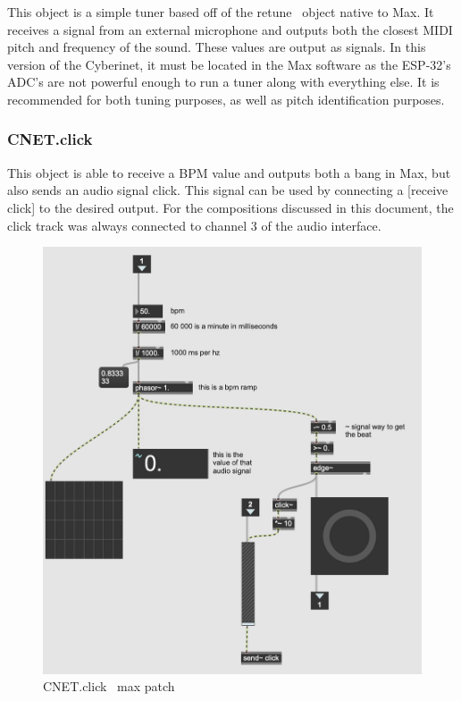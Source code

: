 This object is a simple tuner based off of the retune~ object native to Max. It receives a signal from an external microphone and outputs both the closest MIDI pitch and frequency of the sound. These values are output as signals. In this version of the Cyberinet, it must be located in the Max software as the ESP-32's ADC's are not powerful enough to run a tuner along with everything else. It is recommended for both tuning purposes, as well as pitch identification purposes. 
 

\subsubsection{CNET.click~}
This object is able to receive a BPM value and outputs both a bang in Max, but also sends an audio signal click. This signal can be used by connecting a [receive~ click] to the desired output. For the compositions discussed in this document, the click track was always connected to channel 3 of the audio interface.

\begin{figure}
    \centering
    \includegraphics[scale=0.2]{diagrams/maxPatches/CNET.click~.jpg}
    \caption{CNET.click~ max patch}
    \label{fig:CNET.clickPAtch}
\end{figure}

